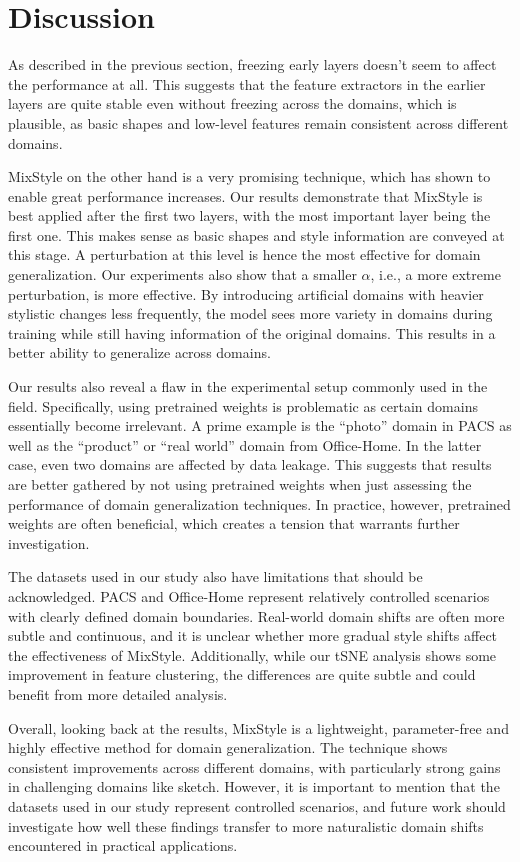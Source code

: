 \section{Discussion}

As described in the previous section, freezing early layers doesn't seem to affect the performance at all. This suggests that the feature extractors in the earlier layers are quite stable even without freezing across the domains, which is plausible, as basic shapes and low-level features remain consistent across different domains.

MixStyle on the other hand is a very promising technique, which has shown to enable great performance increases. Our results demonstrate that MixStyle is best applied after the first two layers, with the most important layer being the first one. This makes sense as basic shapes and style information are conveyed at this stage. A perturbation at this level is hence the most effective for domain generalization. Our experiments also show that a smaller $\alpha$, i.e., a more extreme perturbation, is more effective. By introducing artificial domains with heavier stylistic changes less frequently, the model sees more variety in domains during training while still having information of the original domains. This results in a better ability to generalize across domains.

Our results also reveal a flaw in the experimental setup commonly used in the field. Specifically, using pretrained weights is problematic as certain domains essentially become irrelevant. A prime example is the ``photo'' domain in PACS as well as the ``product'' or ``real world'' domain from Office-Home. In the latter case, even two domains are affected by data leakage. This suggests that results are better gathered by not using pretrained weights when just assessing the performance of domain generalization techniques. In practice, however, pretrained weights are often beneficial, which creates a tension that warrants further investigation.

The datasets used in our study also have limitations that should be acknowledged. PACS and Office-Home represent relatively controlled scenarios with clearly defined domain boundaries. Real-world domain shifts are often more subtle and continuous, and it is unclear whether more gradual style shifts affect the effectiveness of MixStyle. Additionally, while our tSNE analysis shows some improvement in feature clustering, the differences are quite subtle and could benefit from more detailed analysis.

Overall, looking back at the results, MixStyle is a lightweight, parameter-free and highly effective method for domain generalization. The technique shows consistent improvements across different domains, with particularly strong gains in challenging domains like sketch. However, it is important to mention that the datasets used in our study represent controlled scenarios, and future work should investigate how well these findings transfer to more naturalistic domain shifts encountered in practical applications.